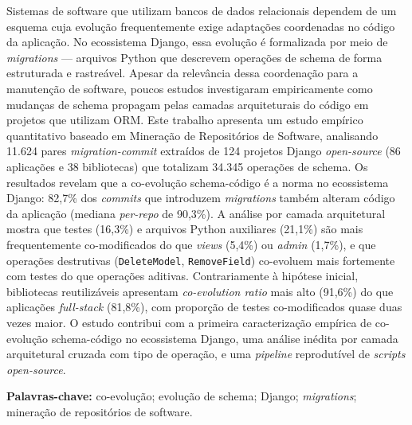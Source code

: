 \documentclass[
  12pt,
  openright,
  oneside,
  a4paper,
  brazil
]{abntex2}
\begin{document}
\begin{resumo}
Sistemas de software que utilizam bancos de dados relacionais dependem de um esquema cuja evolução frequentemente exige adaptações coordenadas no código da aplicação. No ecossistema Django, essa evolução é formalizada por meio de \textit{migrations} --- arquivos Python que descrevem operações de schema de forma estruturada e rastreável. Apesar da relevância dessa coordenação para a manutenção de software, poucos estudos investigaram empiricamente como mudanças de schema propagam pelas camadas arquiteturais do código em projetos que utilizam ORM. Este trabalho apresenta um estudo empírico quantitativo baseado em Mineração de Repositórios de Software, analisando 11.624 pares \textit{migration-commit} extraídos de 124 projetos Django \textit{open-source} (86 aplicações e 38 bibliotecas) que totalizam 34.345 operações de schema. Os resultados revelam que a co-evolução schema-código é a norma no ecossistema Django: 82,7\% dos \textit{commits} que introduzem \textit{migrations} também alteram código da aplicação (mediana \textit{per-repo} de 90,3\%). A análise por camada arquitetural mostra que testes (16,3\%) e arquivos Python auxiliares (21,1\%) são mais frequentemente co-modificados do que \textit{views} (5,4\%) ou \textit{admin} (1,7\%), e que operações destrutivas (\texttt{DeleteModel}, \texttt{RemoveField}) co-evoluem mais fortemente com testes do que operações aditivas. Contrariamente à hipótese inicial, bibliotecas reutilizáveis apresentam \textit{co-evolution ratio} mais alto (91,6\%) do que aplicações \textit{full-stack} (81,8\%), com proporção de testes co-modificados quase duas vezes maior. O estudo contribui com a primeira caracterização empírica de co-evolução schema-código no ecossistema Django, uma análise inédita por camada arquitetural cruzada com tipo de operação, e uma \textit{pipeline} reprodutível de \textit{scripts open-source}.

\vspace{\onelineskip}
\noindent\textbf{Palavras-chave:} co-evolução; evolução de schema; Django; \textit{migrations}; mineração de repositórios de software.
\end{resumo}
\end{document}
